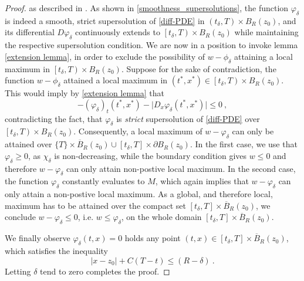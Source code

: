 \begin{theorem}
\begin{proof}
				as described in \cite[p.~73]{barles}. As shown in \ref{smoothness_supersolutions}, the function $ \varphi_{\delta} $ is indeed a smooth, strict supersolution of \eqref{diff-PDE} in $ \left(t_{\delta}, T \right) \times B_R(z_0) $, and its differential $ D \varphi_{\delta} $ continuously extends to $ \left[t_{\delta}, T \right) \times B_R(z_0) $ while maintaining the respective supersolution condition. We are now in a position to invoke lemma \ref{extension lemma}, in order to exclude the possibility of $ w - \phi_{\delta} $ attaining a local maximum in $ \left[t_{\delta}, T \right) \times B_R (z_0) $. Suppose for the sake of contradiction, the function $ w - \phi_{\delta} $ attained a local maximum in $ (t^{*}, x^{*}) \in \left[t_{\delta}, T \right) \times B_R (z_0) $. This would imply by \ref{extension lemma} that
				\begin{equation*}
					-(\varphi_{\delta})_t(t^*, x^*) - \lvert D_x \varphi_{\delta}(t^*, x^*) \rvert \leq 0 \ ,
				\end{equation*}
				contradicting the fact, that $ \varphi_{\delta} $ is \emph{strict} supersolution of \eqref{diff-PDE} over $ \left[t_{\delta}, T \right) \times B_R (z_0) $.
				Consequently, a local maximum of $ w - \varphi_{\delta} $ can only be attained over $ \{T\} \times \overline{B}_R (z_0) \cup \left[t_{\delta}, T\right] \times \partial B_R(z_0) $. In the first case, we use that $ \varphi_{\delta} \geq 0 $, as $ \chi_{\delta} $ is non-decreasing, while the boundary condition gives $ w \leq 0 $ and therefore $ w - \varphi_{\delta} $ can only attain non-postive local maximum. In the second case, the function $ \varphi_{\delta} $ constantly evaluates to $ M $, which again implies that $ w - \varphi_{\delta} $ can only attain a non-postive local maximum. As a global, and therefore local, maximum has to be attained over the compact set $ \left[t_{\delta}, T\right] \times \overline{B}_R (z_0)$, we conclude $ w - \varphi_{\delta} \leq 0$, i.e. $ w \leq \varphi_{\delta} $, on the whole domain $ \left[t_{\delta}, T\right] \times \overline{B}_R (z_0) $.
				
				We finally observe $ \varphi_{\delta}(t, x) = 0 $ holds any point $ (t, x) \in \left[t_{\delta}, T\right] \times \overline{B}_R(z_0)$, which satisfies the inequality
				\begin{equation*}
					\lvert x - z_0 \rvert + C(T - t) \leq (R - \delta) \ .
				\end{equation*}
				Letting $ \delta $ tend to zero completes the proof.
			\end{proof}
		\end{theorem}
